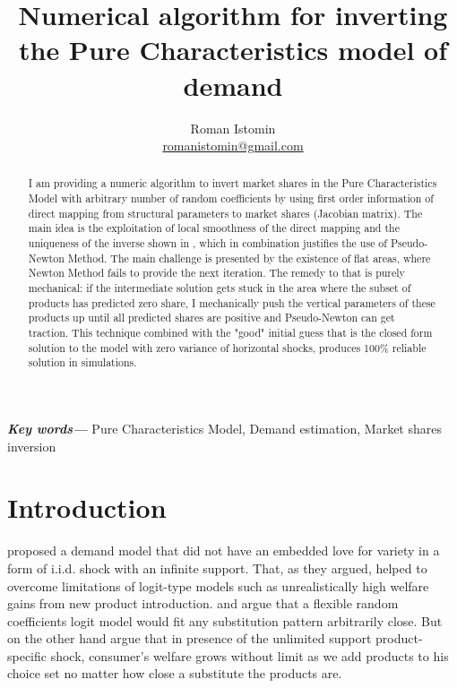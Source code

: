 \documentclass[12pt,letterpaper]{article}
\author{Roman Istomin \\  \href{mailto:romanistomin@gmail.com}{romanistomin@gmail.com} }
\title{Numerical algorithm for inverting the Pure Characteristics model of demand}
\providecommand{\keywords}[1]{\textbf{\textit{Key words---}} #1}
\begin{document}
	\maketitle
	
	\begin{abstract}
	I am providing a numeric algorithm to invert market shares in the Pure Characteristics Model with arbitrary number of random coefficients by using first order information of direct mapping from structural parameters to market shares (Jacobian matrix). The main idea is the exploitation of local smoothness of the direct mapping and the uniqueness of the inverse shown in \cite{berry2007pure}, which in combination justifies the use of Pseudo-Newton Method. The main challenge is presented by the existence of flat areas, where Newton Method fails to provide the next iteration. The remedy to that is purely mechanical: if the intermediate solution gets stuck in the area where the subset of products has predicted zero share, I mechanically push the vertical parameters of these products up until all predicted shares are positive and Pseudo-Newton can get traction.
	This technique combined with the "good" initial guess that is the closed form solution to the model with zero variance of horizontal shocks, produces 100\% reliable solution in simulations.
	\end{abstract}
	
	\keywords{Pure Characteristics Model, Demand estimation, Market shares inversion}
	
	\section{Introduction}
	\cite{berry2007pure} proposed a demand model that did not have an embedded love for variety in a form of i.i.d. shock with an infinite support. That, as they argued, helped to overcome limitations of logit-type models such as unrealistically high welfare gains from new product introduction. \cite{mcfadden1978modeling} and \cite{nevo2000practitioner} argue that a flexible random coefficients logit model would fit any substitution pattern arbitrarily close. But on the other hand \cite{berry2007pure} argue that in presence of the unlimited support product-specific shock, consumer's welfare grows without limit as we add products to his choice set no matter how close a substitute the products are. 
	
\end{document}
